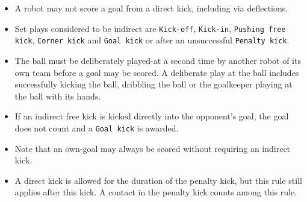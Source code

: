 \begin{itemize}
  \item A robot may not score a goal from a direct kick, including via deflections.
  \item Set plays considered to be indirect are \texttt{Kick-off}, \texttt{Kick-in}, \texttt{Pushing free kick}, \texttt{Corner kick} and \texttt{Goal kick} or after an unsuccessful \texttt{Penalty kick}.
  \item The ball must be deliberately played-at a second time by another robot of its own team before a goal may be scored.
    A deliberate play at the ball includes successfully kicking the ball, dribbling the ball or the goalkeeper playing at the ball with its hands.
  \item If an indirect free kick is kicked directly into the opponent's goal, the goal does not count and a \texttt{Goal kick} is awarded.
  \item Note that an own-goal may always be scored without requiring an indirect kick.
  \item A direct kick is allowed for the duration of the penalty kick, but this rule still applies after this kick. A contact in the penalty kick counts among this rule.  
\end{itemize}

